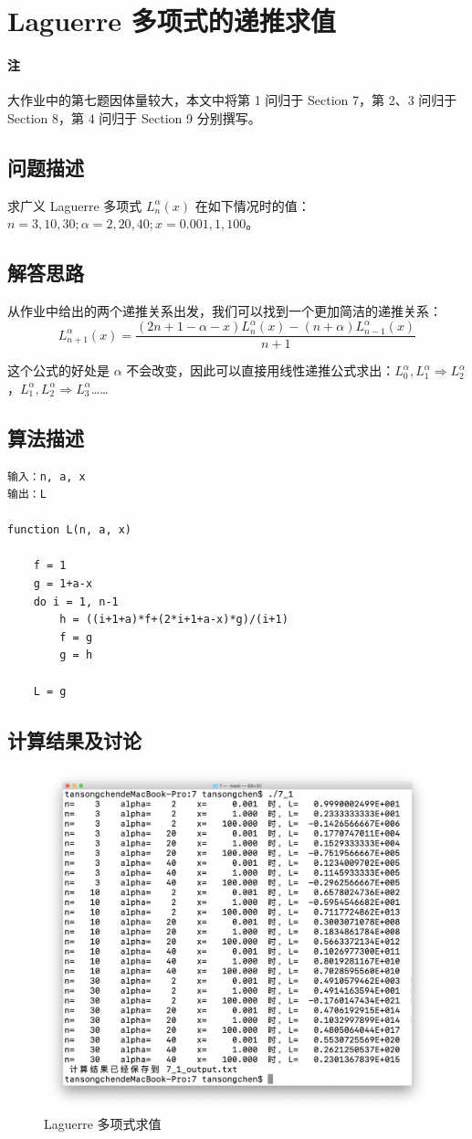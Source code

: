 \documentclass{ctexart}
\begin{document}
\section{Laguerre 多项式的递推求值}
\paragraph{注} 大作业中的第七题因体量较大，本文中将第 1 问归于 Section 7，第 2、3 问归于 Section 8，第 4 问归于 Section 9 分别撰写。
\subsection{问题描述}
求广义 Laguerre 多项式 $L_n^\alpha(x)$ 在如下情况时的值：$n=3, 10, 30; \alpha=2, 20, 40;x=0.001, 1, 100$。
\subsection{解答思路}
从作业中给出的两个递推关系出发，我们可以找到一个更加简洁的递推关系：
\[
L_{n+1}^\alpha(x)=\frac{(2n+1-\alpha-x)L_{n}^\alpha(x)-(n+\alpha)L_{n-1}^\alpha(x)}{n+1}
\]

这个公式的好处是 $\alpha$ 不会改变，因此可以直接用线性递推公式求出：$L_0^\alpha,L_1^\alpha\Rightarrow L_2^\alpha$，$L_1^\alpha,L_2^\alpha\Rightarrow L_3^\alpha$……
\subsection{算法描述}
\begin{lstlisting}
输入：n, a, x
输出：L

function L(n, a, x)

    f = 1
    g = 1+a-x
    do i = 1, n-1
        h = ((i+1+a)*f+(2*i+1+a-x)*g)/(i+1)
        f = g
        g = h

    L = g
\end{lstlisting}
\subsection{计算结果及讨论}
\begin{figure}[h]
\centering
\includegraphics[scale = 0.3]{laguerre.png}
\caption{Laguerre 多项式求值}
\end{figure}
\end{document}
